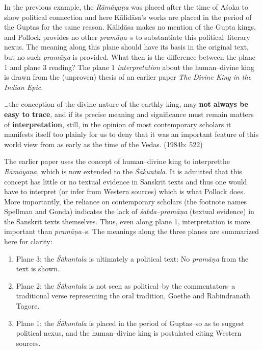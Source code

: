 In the previous example, the \textit{Rāmāyaṇa} was placed after the time of Aśoka to show political connection and here Kālidāsa’s works are placed in the period of the Guptas for the same reason. Kālidāsa makes no mention of the Gupta kings, and Pollock provides no other \textit{pramāṇa}–s to substantiate this political–literary nexus. The meaning along this plane should have its basis in the original text, but no such \textit{pramāṇa} is provided. What then is the difference between the plane 1 and plane 3 reading? The plane 1 \textit{interpretation} about the human–divine king is drawn from the (unproven) thesis of an earlier paper \textit{The Divine King in the Indian Epic}.

\begin{myquote}
…the conception of the divine nature of the earthly king, may \textbf{not always be easy to trace}, and if its precise meaning and significance must remain matters of \textbf{interpretation}, still, in the opinion of most contemporary scholars it manifests itself too plainly for us to deny that it was an important feature of this world view from as early as the time of the Vedas. (1984b: 522)
\end{myquote}

The earlier paper uses the concept of human–divine king to interpretthe \textit{Rāmāyaṇa}, which is now extended to the \textit{Śākuntala}. It is admitted that this concept has little or no textual evidence in Sanskrit texts and thus one would have to interpret (or infer from Western sources) which is what Pollock does. More importantly, the reliance on contemporary scholars (the footnote names Spellman and Gonda) indicates the lack of \textit{śabda–pramāṇa} (textual evidence) in the Sanskrit texts themselves. Thus, even along plane 1, interpretation is more important than \textit{pramāṇa}–s. The meanings along the three planes are summarized here for clarity:

\newpage

\begin{enumerate}
\itemsep=0pt
\item Plane 3: the \textit{Śākuntala} is ultimately a political text: No \textit{pramāṇa} from the text is shown.

 \item Plane 2: the \textit{Śākuntala} is not seen as political–by the commentators–a traditional verse representing the oral tradition, Goethe and Rabindranath Tagore.

 \item Plane 1: the \textit{Śākuntala} is placed in the period of Guptas–so as to suggest political nexus, and the human–divine king is postulated citing Western sources.

\end{enumerate}

